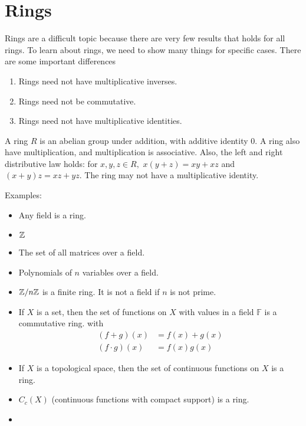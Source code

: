 \documentclass[a4paper]{article}
\begin{document}
\section{Rings}
Rings are a difficult topic because there are very few results that holds for all rings. To learn about rings, we need to show many things for specific cases. There are some important differences \begin{enumerate}
    \item Rings need not have multiplicative inverses.
    \item Rings need not be commutative.
    \item Rings need not have multiplicative identities.
\end{enumerate}
\begin{definition}[Ring]
    A ring $R$ is an abelian group under addition, with additive identity $0.$ A ring also have multiplication, and multiplication is associative. Also, the left and right distributive law holds: for $x,y,z\in R,$ $x(y+z)=xy+xz$ and $(x+y)z=xz+yz.$
    The ring may not have a multiplicative identity. 
\end{definition}
Examples:\begin{itemize}
    \item Any field is a ring.
    \item $\mathbb{Z}$
    \item The set of all matrices over a field.
    \item Polynomials of $n$ variables over a field.
    \item $\mathbb{Z}/n\mathbb{Z}$ is a finite ring. It is not a field if $n$ is not prime.
    \item If $X$ is a set, then the set of functions on $X$ with values in a field $\mathbb F$ is a commutative ring. with \begin{align}
        (f+g)(x)&=f(x)+g(x)\\
        (f\cdot g)(x)&=f(x)g(x)
    \end{align}
    \item If $X$ is a topological space, then the set of continuous functions on $X$ is a ring.
    \item $C_c(X)$ (continuous functions with compact support) is a ring.
    \item  
\end{itemize}
\end{document}
